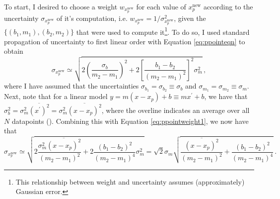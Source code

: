 To start, I desired to choose a weight $w_{x_p^\text{new}}$ for each value of $x_p^\text{new}$ according to the uncertainty $\sigma_{x_p^\text{new}}$ of it's computation, i.e. $w_{x_p^\text{new}}=1/\sigma_{x_p^\text{new}}^2$, given the $\{(b_1,m_1),(b_2,m_2)\}$ that were used to compute it\footnote{This relationship between weight and uncertainty assumes (approximately) Gaussian error.}. To do so, I used standard propagation of uncertainty to first linear order with Equation \eqref{eq:ppointeqn} to obtain
\begin{equation}
\label{eq:ppointweight1}
\sigma_{x_p^\text{new}} \simeq \sqrt{2\left(\frac{\sigma_b}{m_2-m_1}\right)^2 + 2\left[\frac{b_1-b_2}{(m_2-m_1)^2}\right]^2\sigma_m^2}\,,
\end{equation}
where I have assumed that the uncertainties $\sigma_{b_1}=\sigma_{b_2}\equiv\sigma_b$ and $\sigma_{m_1}=\sigma_{m_2}\equiv\sigma_m$. Next, note that for a linear model $y=m(x-x_p)+b\equiv mx^\prime+b$, we have that $\sigma_b^2=\sigma_m^2\overline{(x^\prime)^2}=\sigma_m^2\overline{(x-x_p)^2}$, where the overline indicates an average over all $N$ datapoints (\textcite{morrison2014obtaining}). Combining this with Equation \eqref{eq:ppointweight1}, we now have that 
\begin{equation}
\label{eq:ppointweight2}
\sigma_{x_p^\text{new}} \simeq \sqrt{2\frac{\sigma_m^2\overline{(x-x_p)^2}}{(m_2-m_1)^2} + 2\frac{(b_1-b_2)^2}{(m_2-m_1)^4}\sigma_m^2}=\sqrt{2}\sigma_m\sqrt{\frac{\overline{(x-x_p)^2}}{(m_2-m_1)^2} + \frac{(b_1-b_2)^2}{(m_2-m_1)^4}}\,.
\end{equation}

